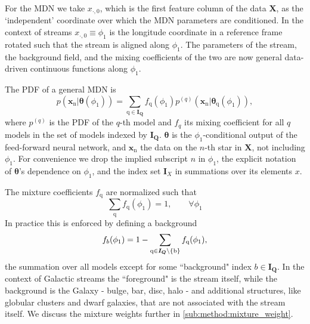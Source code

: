 \documentclass[twocolumn]{aastex631}
\newcommand{\mrm}[1]{\mathrm{#1}}
\newcommand{\mbs}[1]{\boldsymbol{#1}}
\newcommand{\mbf}[1]{\mathbf{#1}}
\newcommand{\mcal}[1]{\mathcal{#1}}
\newcommand{\pdf}{p}
\newcommand{\prior}{\mcal{\pi}}
\newcommand{\nth}[1]{{#1}_{\mrm{n}}}  %
\newcommand{\qth}[1]{{#1}_{\mrm{q}}}  %
\newcommand{\smallcomponent}[2]{#2^{\scriptscriptstyle (#1)}}
\newcommand{\cmp}[2]{\smallcomponent{#1}{#2}}
\begin{document}
        For the MDN we take $x_{\cdot, 0}$, which is the first feature column of
        the data $\mbf{X}$, as the `independent' coordinate over which the MDN
        parameters are conditioned. In the context of streams $x_{\cdot, 0}
        \equiv \phi_1$ is the longitude coordinate in a reference frame rotated
        such that the stream is aligned along $\phi_1$. The parameters of the
        stream, the background field, and the mixing coefficients of the two are
        now general data-driven continuous functions along $\phi_1$.

        The PDF of a general MDN is
        \begin{equation} \label{eq:general_mixture_network}
            \!\!\! \pdf(\nth{\mbs{x}} | \mbs{\theta}(\phi_1))
            \!=\! \sum_{\mrm{q} \in \mbs{I_Q}} \! \qth{f}(\phi_1) \cmp{q}{\pdf}(\nth{\mbs{x}}|\qth{\mbs{\theta}}(\phi_1)),
        \end{equation}
        where $\cmp{q}{\pdf}$ is the PDF of the $q$-th model and $f_q$ its
        mixing coefficient for all $q$ models in the set of models indexed by
        $\mbs{I_Q}$. $\mbs{\theta}$ is the $\phi_1$-conditional output of the
        feed-forward neural network, and $\nth{\mbs{x}}$ the data on the $n$-th
        star in $\mbs{X}$, not including $\phi_1$. For convenience we drop the
        implied subscript $n$ in $\phi_1$, the explicit notation of
        $\mbs{\theta}$'s dependence on $\phi_1$, and the index set $\mbs{I}_X$
        in summations over its elements $x$.

        The mixture coefficients $\qth{f}$ are normalized such that
        \begin{equation} \label{eq:mixture_weight_sum}
            \sum_{\mrm{q}} \qth{f}(\phi_1) = 1, \qquad \forall \phi_1
        \end{equation}
        In practice this is enforced by defining a background
        \begin{equation} \label{eq:mixture_weight_normalization}
            f_{b}(\phi_1) = 1 - \sum_{\rm{q}\in \mbs{I_Q}\backslash \{b\}} \qth{f}(\phi_1),
        \end{equation}
        the summation over all models except for some ``background" index $b \in
        \mbs{I_Q}$.  In the context of Galactic streams the ``foreground" is the
        stream itself, while the background is the Galaxy - bulge, bar, disc,
        halo - and additional structures, like globular clusters and dwarf
        galaxies, that are not associated with the stream itself.  We discuss
        the mixture weights further in \autoref{sub:method:mixture_weight}.
\end{document}
